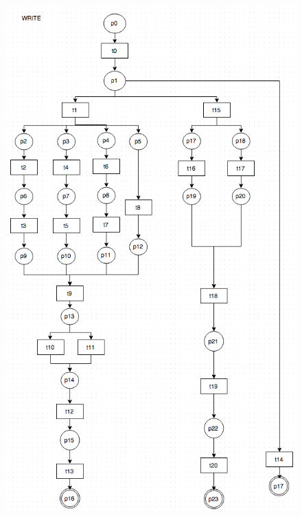 \documentclass[conference]{IEEEtran}
\begin{document}
\begin{figure} 
\centerline{
\includegraphics[width=3.7In]{figures/Fig5.png}}


\end{figure}
\end{document}
